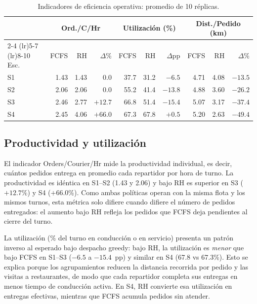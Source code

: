 \documentclass[12pt,letterpaper,oneside]{book}
\begin{document}
	\begin{table}[htbp]
	\centering
	\small
	\caption{Indicadores de eficiencia operativa: promedio de 10 réplicas.}
	\label{tab:res_eficiencia}
	\begin{tabular}{@{}l rr r rr r rr r@{}}
	\toprule
	& \multicolumn{3}{c}{Ord./C/Hr} & \multicolumn{3}{c}{Utilización (\%)} & \multicolumn{3}{c}{Dist./Pedido (km)} \\
	\cmidrule(lr){2-4} \cmidrule(lr){5-7} \cmidrule(lr){8-10}
	Esc. & FCFS & RH & $\Delta$\% & FCFS & RH & $\Delta$pp & FCFS & RH & $\Delta$\% \\
	\midrule
	S1 & 1.43 & 1.43 & $0.0$   & 37.7 & 31.2 & $-6.5$  & 4.71 & 4.08 & $-13.5$ \\
	S2 & 2.06 & 2.06 & $0.0$   & 55.2 & 41.4 & $-13.8$ & 4.88 & 3.60 & $-26.2$ \\
	S3 & 2.46 & 2.77 & $+12.7$ & 66.8 & 51.4 & $-15.4$ & 5.07 & 3.17 & $-37.4$ \\
	S4 & 2.45 & 4.06 & $+66.0$ & 67.3 & 67.8 & $+0.5$  & 5.20 & 2.63 & $-49.4$ \\
	\bottomrule
	\end{tabular}
	\end{table}

	\subsection{Productividad y utilización}

	El indicador Orders/Courier/Hr mide la productividad individual, es decir,
	cuántos pedidos entrega en promedio cada repartidor por hora de turno.  La
	productividad es idéntica en S1--S2 (1.43 y 2.06) y bajo RH es superior en S3
	($+12.7\%$) y S4 ($+66.0\%$).  Como ambas políticas operan con la misma flota y los
	mismos turnos, esta métrica solo difiere cuando difiere el número de pedidos
	entregados: el aumento bajo RH refleja los pedidos que FCFS deja pendientes al
	cierre del turno.

	La utilización (\% del turno en conducción o en servicio) presenta un patrón inverso al
	esperado bajo despacho greedy: bajo RH, la utilización es \emph{menor} que bajo
	FCFS en S1--S3 ($-6.5$ a $-15.4$~pp) y similar en S4 (67.8 vs 67.3\%).  Esto se explica porque los
	agrupamientos reducen la distancia recorrida por pedido y las visitas a restaurantes, de modo que cada
	repartidor completa sus entregas en menos tiempo de conducción activa.  En S4, RH convierte esa
	utilización en entregas efectivas, mientras que FCFS acumula pedidos sin atender.
\end{document}
